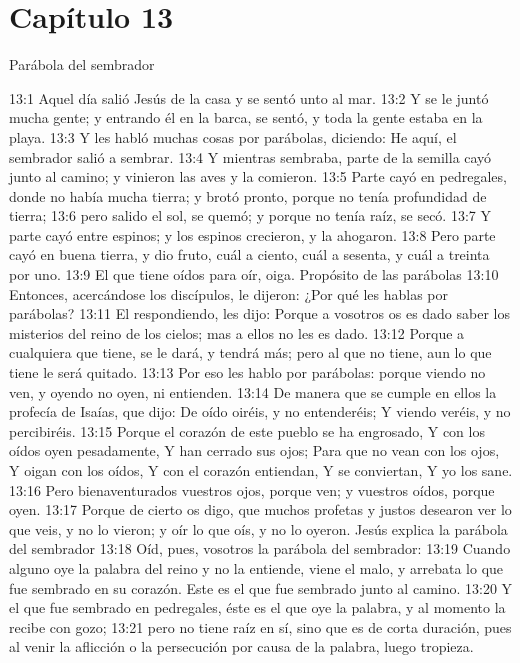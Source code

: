 \section*{Capítulo 13}
Parábola del sembrador  

13:1 Aquel día salió Jesús de la casa y se sentó unto al mar. 
13:2 Y se le juntó mucha gente; y entrando él en la barca, se sentó, y toda la gente estaba en la playa. 
13:3 Y les habló muchas cosas por parábolas, diciendo: He aquí, el sembrador salió a sembrar. 
13:4 Y mientras sembraba, parte de la semilla cayó junto al camino; y vinieron las aves y la comieron. 
13:5 Parte cayó en pedregales, donde no había mucha tierra; y brotó pronto, porque no tenía profundidad de tierra; 
13:6 pero salido el sol, se quemó; y porque no tenía raíz, se secó. 
13:7 Y parte cayó entre espinos; y los espinos crecieron, y la ahogaron. 
13:8 Pero parte cayó en buena tierra, y dio fruto, cuál a ciento, cuál a sesenta, y cuál a treinta por uno. 
13:9 El que tiene oídos para oír, oiga. 
Propósito de las parábolas  
13:10 Entonces, acercándose los discípulos, le dijeron: ¿Por qué les hablas por parábolas? 
13:11 El respondiendo, les dijo: Porque a vosotros os es dado saber los misterios del reino de los cielos; mas a ellos no les es dado. 
13:12 Porque a cualquiera que tiene, se le dará, y tendrá más; pero al que no tiene, aun lo que tiene le será quitado. 
13:13 Por eso les hablo por parábolas: porque viendo no ven, y oyendo no oyen, ni entienden. 
13:14 De manera que se cumple en ellos la profecía de Isaías, que dijo: 
De oído oiréis, y no entenderéis; 
Y viendo veréis, y no percibiréis. 
13:15 Porque el corazón de este pueblo se ha engrosado, 
Y con los oídos oyen pesadamente, 
Y han cerrado sus ojos; 
Para que no vean con los ojos, 
Y oigan con los oídos, 
Y con el corazón entiendan, 
Y se conviertan, 
Y yo los sane. 
13:16 Pero bienaventurados vuestros ojos, porque ven; y vuestros oídos, porque oyen. 
13:17 Porque de cierto os digo, que muchos profetas y justos desearon ver lo que veis, y no lo vieron; y oír lo que oís, y no lo oyeron. 
Jesús explica la parábola del sembrador  
13:18 Oíd, pues, vosotros la parábola del sembrador: 
13:19 Cuando alguno oye la palabra del reino y no la entiende, viene el malo, y arrebata lo que fue sembrado en su corazón. Este es el que fue sembrado junto al camino. 
13:20 Y el que fue sembrado en pedregales, éste es el que oye la palabra, y al momento la recibe con gozo; 
13:21 pero no tiene raíz en sí, sino que es de corta duración, pues al venir la aflicción o la persecución por causa de la palabra, luego tropieza. 
